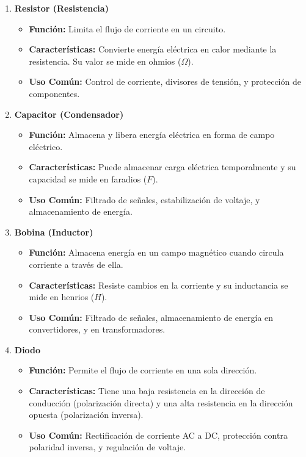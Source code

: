 \begin{enumerate}
	\item \textbf{Resistor (Resistencia)}
	      \begin{itemize}
		      \item \textbf{Función:} Limita el flujo de corriente en un circuito.
		      \item \textbf{Características:} Convierte energía eléctrica en calor mediante la resistencia. Su valor se mide en ohmios (\(\Omega\)).
		      \item \textbf{Uso Común:} Control de corriente, divisores de tensión, y protección de componentes.
	      \end{itemize}

	\item \textbf{Capacitor (Condensador)}
	      \begin{itemize}
		      \item \textbf{Función:} Almacena y libera energía eléctrica en forma de campo eléctrico.
		      \item \textbf{Características:} Puede almacenar carga eléctrica temporalmente y su capacidad se mide en faradios (\(F\)).
		      \item \textbf{Uso Común:} Filtrado de señales, estabilización de voltaje, y almacenamiento de energía.
	      \end{itemize}

	\item \textbf{Bobina (Inductor)}
	      \begin{itemize}
		      \item \textbf{Función:} Almacena energía en un campo magnético cuando circula corriente a través de ella.
		      \item \textbf{Características:} Resiste cambios en la corriente y su inductancia se mide en henrios (\(H\)).
		      \item \textbf{Uso Común:} Filtrado de señales, almacenamiento de energía en convertidores, y en transformadores.
	      \end{itemize}

	\item \textbf{Diodo}
	      \begin{itemize}
		      \item \textbf{Función:} Permite el flujo de corriente en una sola dirección.
		      \item \textbf{Características:} Tiene una baja resistencia en la dirección de conducción (polarización directa) y una alta resistencia en la dirección opuesta (polarización inversa).
		      \item \textbf{Uso Común:} Rectificación de corriente AC a DC, protección contra polaridad inversa, y regulación de voltaje.
	      \end{itemize}
\end{enumerate}
